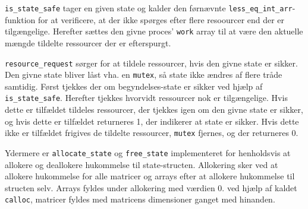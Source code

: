 \texttt{is\_state\_safe} tager en given state og kalder den førnævnte \texttt{less\_eq\_int\_arr}-funktion for at verificere, at der ikke spørges efter flere resoourcer end der er tilgængelige. Herefter sættes den givne proces' \texttt{work} array til at være den aktuelle mængde tildelte ressourcer der er efterspurgt. 

\texttt{resource\_request} sørger for at tildele ressourcer, hvis den givne state er sikker. Den givne state bliver låst vha. en \texttt{mutex}, så state ikke ændres af flere tråde samtidig.  
Først tjekkes der om begyndelses-state er sikker ved hjælp af \texttt{is\_state\_safe}. Herefter tjekkes hvorvidt ressourcer nok er tilgængelige. Hvis dette er tilfældet tildeles ressourcer, der tjekkes igen om den givne state er sikker, og hvis dette er tilfældet returneres 1, der indikerer at state er sikker. Hvis dette ikke er tilfældet frigives de tildelte ressourcer, \texttt{mutex} fjernes, og der returneres 0.

Ydermere er \texttt{allocate\_state} og \texttt{free\_state} implementeret for henholdsvis at allokere og deallokere hukommelse til state-structen. Allokering sker ved at allokere hukommelse for alle matricer og arrays efter at allokere hukommelse til structen selv. Arrays fyldes under allokering med værdien 0. ved hjælp af kaldet \texttt{calloc}, matricer fyldes med matricens dimensioner ganget med hinanden.